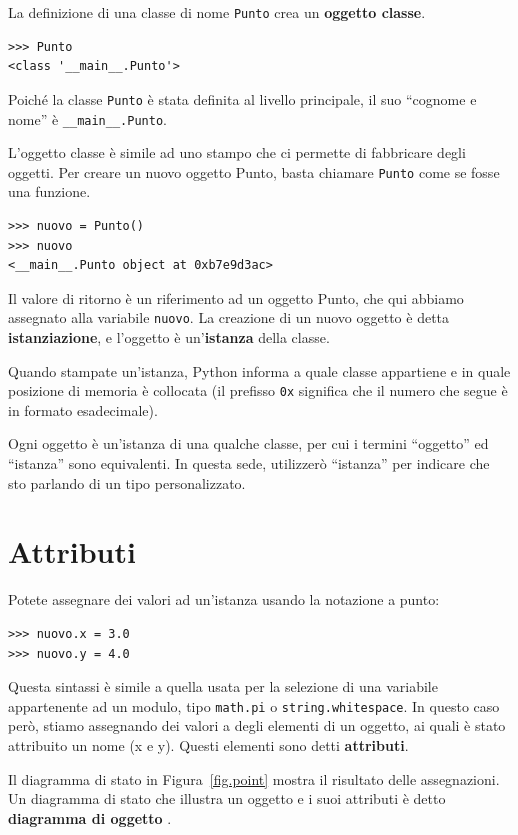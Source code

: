 \documentclass[10pt]{book}
\begin{document}
La definizione di una classe di nome {\tt Punto} crea un {\bf oggetto classe}.

\begin{verbatim}
>>> Punto
<class '__main__.Punto'>
\end{verbatim}
%
Poiché la classe {\tt Punto} è stata definita al livello principale, il suo ``cognome e nome'' è \verb"__main__.Punto".

L'oggetto classe è simile ad uno stampo che ci permette di fabbricare degli oggetti. Per creare un nuovo oggetto Punto, basta chiamare {\tt Punto} come se fosse una funzione.

\begin{verbatim}
>>> nuovo = Punto()
>>> nuovo
<__main__.Punto object at 0xb7e9d3ac>
\end{verbatim}
%
Il valore di ritorno è un riferimento ad un oggetto Punto, che qui abbiamo assegnato alla variabile {\tt nuovo}.  
La creazione di un nuovo oggetto è detta
{\bf istanziazione}, e l'oggetto è un'{\bf istanza} della classe.

Quando stampate un'istanza, Python informa a quale classe appartiene e in quale posizione di memoria è collocata (il prefisso {\tt 0x} significa che il numero che segue è in formato esadecimale).

Ogni oggetto è un'istanza di una qualche classe, per cui i termini ``oggetto'' ed
``istanza'' sono equivalenti.  In questa sede, utilizzerò ``istanza'' per indicare che sto parlando di un tipo personalizzato.

\section{Attributi}
\label{attributes}

Potete assegnare dei valori ad un'istanza usando la notazione a punto:

\begin{verbatim}
>>> nuovo.x = 3.0
>>> nuovo.y = 4.0
\end{verbatim}
%
Questa sintassi è simile a quella usata per la selezione di una variabile appartenente ad un modulo, tipo {\tt math.pi} o {\tt string.whitespace}.  In questo caso però, stiamo assegnando dei valori a degli elementi di un oggetto, ai quali è stato attribuito un nome (x e y). Questi elementi sono detti {\bf attributi}.

Il diagramma di stato in Figura~\ref{fig.point} mostra il risultato delle assegnazioni. Un diagramma di stato che illustra un oggetto e i suoi attributi è detto {\bf diagramma di oggetto} .
\end{document}
